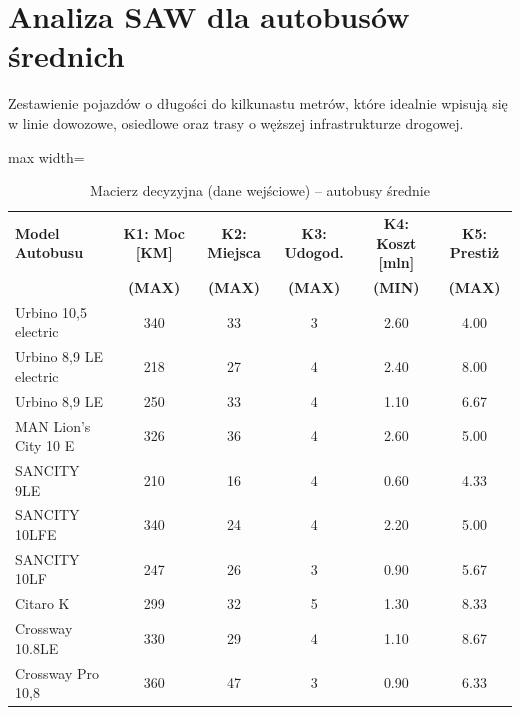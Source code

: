 \section{Analiza SAW dla autobusów średnich}

Zestawienie pojazdów o długości do kilkunastu metrów, które idealnie wpisują się w linie dowozowe, osiedlowe oraz trasy o węższej infrastrukturze drogowej.

\begin{table}[H]
    \centering
    \caption{Macierz decyzyjna (dane wejściowe) -- autobusy średnie}
    \vspace{0.2cm}
    \begin{adjustbox}{max width=\textwidth}
    \begin{tabular}{|l|c|c|c|c|c|}
        \hline
        \textbf{Model Autobusu} & \textbf{K1: Moc [KM]} & \textbf{K2: Miejsca} & \textbf{K3: Udogod.} & \textbf{K4: Koszt [mln]} & \textbf{K5: Prestiż} \\ 
        & \textbf{(MAX)} & \textbf{(MAX)} & \textbf{(MAX)} & \textbf{(MIN)} & \textbf{(MAX)} \\ \hline
        Urbino 10,5 electric & 340 & 33 & 3 & 2.60 & 4.00 \\ \hline
        Urbino 8,9 LE electric & 218 & 27 & 4 & 2.40 & 8.00 \\ \hline
        Urbino 8,9 LE & 250 & 33 & 4 & 1.10 & 6.67 \\ \hline
        MAN Lion's City 10 E & 326 & 36 & 4 & 2.60 & 5.00 \\ \hline
        SANCITY 9LE & 210 & 16 & 4 & 0.60 & 4.33 \\ \hline
        SANCITY 10LFE & 340 & 24 & 4 & 2.20 & 5.00 \\ \hline
        SANCITY 10LF & 247 & 26 & 3 & 0.90 & 5.67 \\ \hline
        Citaro K & 299 & 32 & 5 & 1.30 & 8.33 \\ \hline
        Crossway 10.8LE & 330 & 29 & 4 & 1.10 & 8.67 \\ \hline
        Crossway Pro 10,8 & 360 & 47 & 3 & 0.90 & 6.33 \\ \hline
    \end{tabular}
    \end{adjustbox}
\end{table}

